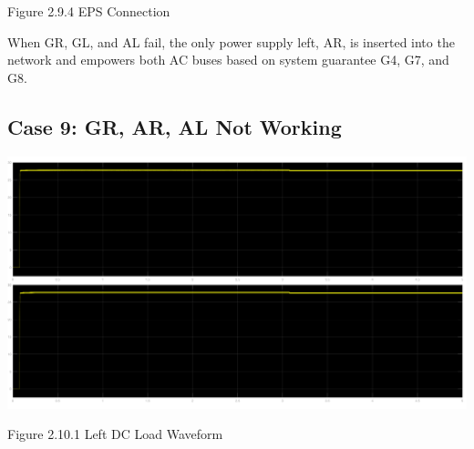 \documentclass{mcmthesis}
\begin{document}
\begin{center}
\small{Figure 2.9.4 EPS Connection}
\end{center}
When GR, GL,  and AL fail,  the only power supply left, AR, is inserted into the network and empowers both AC buses based on system guarantee G4, G7, and G8.
\pagebreak

\subsection{Case 9: GR, AR, AL Not Working}
\begin{center}
\includegraphics[trim= 0 0.28\imageheight{} 0 0, clip, width = 0.165\imageheight{}]{gr_ar_al_load1.png}
\end{center}
\begin{center}
\small{Figure 2.10.1 Left DC Load Waveform}
\end{center}
\end{document}
